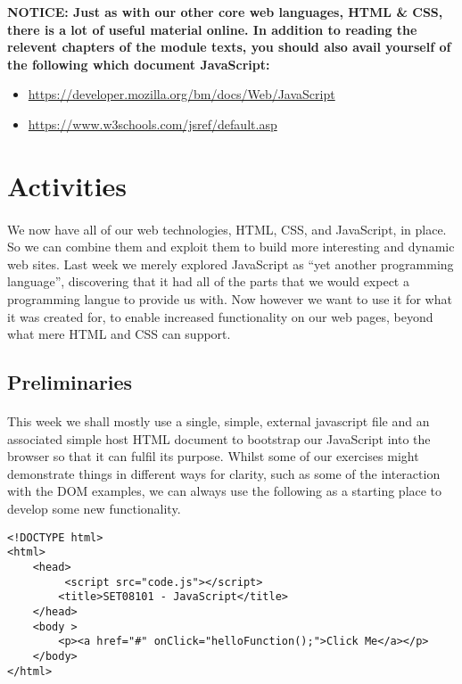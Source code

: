 \documentclass[10pt, a4paper, twosize]{article}
\begin{document}
\begin{framed}
{\bf{NOTICE:} Just as with our other core web languages, HTML \& CSS, there is a lot of useful material online. In addition to reading the relevent chapters of the module texts, you should also avail yourself of the following which document JavaScript:
\begin{itemize}
\item \url{https://developer.mozilla.org/bm/docs/Web/JavaScript}
\item \url{https://www.w3schools.com/jsref/default.asp}
\end{itemize}
  }
\end{framed}


\section{Activities}
\paragraph{} We now have all of our web technologies, HTML, CSS, and JavaScript, in place. So we can combine them and exploit them to build more interesting and dynamic web sites. Last week we merely explored JavaScript as ``yet another programming language'', discovering that it had all of the parts that we would expect a programming langue to provide us with. Now however we want to use it for what it was created for, to enable increased functionality on our web pages, beyond what mere HTML and CSS can support.

\subsection{Preliminaries}
\paragraph{} This week we shall mostly use a single, simple, external javascript file and an associated simple host HTML document to bootstrap our JavaScript into the browser so that it can fulfil its purpose. Whilst some of our exercises might demonstrate things in different ways for clarity, such as some of the interaction with the DOM examples, we can always use the following as a starting place to develop some new functionality.

\begin{lstlisting}
<!DOCTYPE html>
<html>
    <head>
         <script src="code.js"></script> 
        <title>SET08101 - JavaScript</title>
    </head>
    <body >
        <p><a href="#" onClick="helloFunction();">Click Me</a></p>
    </body>
</html>
\end{lstlisting}
\end{document}
